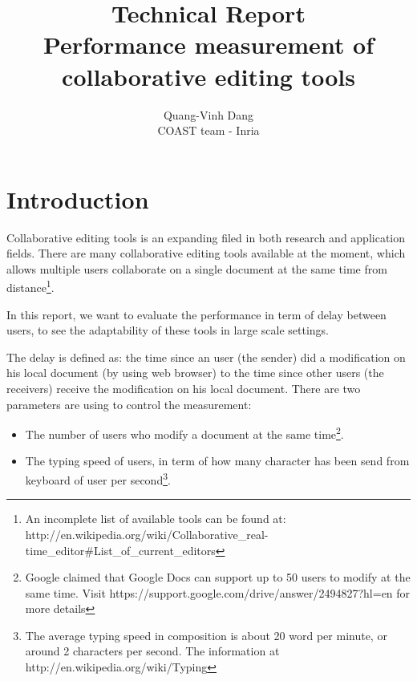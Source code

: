 \documentclass[a4paper,12pt]{report}
\begin{document}
\author{Quang-Vinh Dang\\
COAST team - Inria}
\title{Technical Report\\ Performance measurement of collaborative editing tools}\maketitle

\section{Introduction}
Collaborative editing tools is an expanding filed in both research and application fields. There are many collaborative editing tools available at the moment, which allows multiple users collaborate on a single document at the same time from distance\footnote{An incomplete list of available tools can be found at: http://en.wikipedia.org/wiki/Collaborative\_real-time\_editor\#List\_of\_current\_editors}.

In this report, we want to evaluate the performance in term of delay between users, to see the adaptability of these tools in large scale settings.

The delay is defined as: the time since an user (the sender) did a modification on his local document (by using web browser) to the time since other users (the receivers) receive the modification on his local document.
There are two parameters are using to control the measurement:
	\begin{itemize}
		\item The number of users who modify a document at the same time\footnote{Google claimed that Google Docs can support up to 50 users to modify at the same time. Visit https://support.google.com/drive/answer/2494827?hl=en for more details}.
		\item The typing speed of users, in term of how many character has been send from keyboard of user per second\footnote{The average typing speed in composition is about 20 word per minute, or around 2 characters per second. The information at http://en.wikipedia.org/wiki/Typing}.
	\end{itemize}
\end{document}
